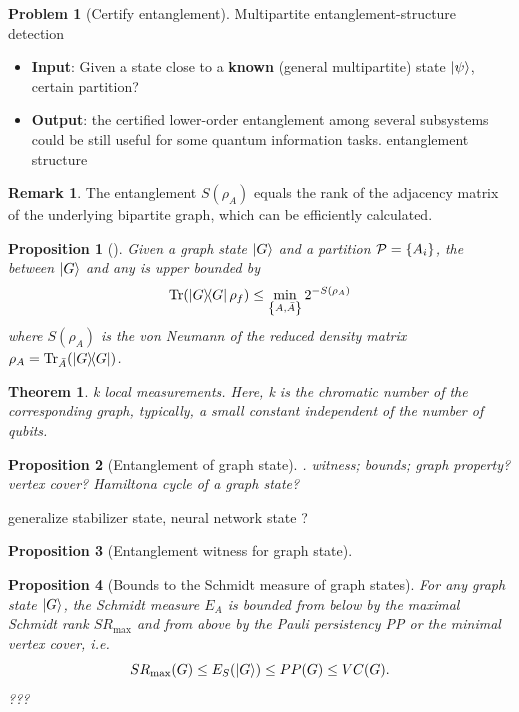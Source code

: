 \documentclass[
10pt,
aps,
pra,
linenumbers,
floatfix,
]{revtex4-2}
\theoremstyle{plain}
\newtheorem{theorem}{Theorem}
\newtheorem{proposition}{Proposition}
\theoremstyle{definition}
\newtheorem{remark}{Remark}
\newtheorem{problem}{Problem}
\newcommand{\dm}{\rho}
\begin{document}
\begin{problem}[Certify entanglement]
	Multipartite entanglement-structure detection
	\begin{itemize}
		\item \textbf{Input}: Given a state close to a \textbf{known} (general multipartite) state $\ket{\psi}$,
		certain partition?
		\item \textbf{Output}: the certified lower-order entanglement among several subsystems could be still useful for some quantum information tasks.
		entanglement structure
	\end{itemize}
\end{problem}
\begin{remark}
	The entanglement  $S( \dm_A )$ equals the rank of the adjacency matrix of the underlying bipartite graph, which can be efficiently calculated.
\end{remark}
\begin{proposition}[\cite{zhouDetectingMultipartiteEntanglement2019}]
	Given a graph state $\ket{G}$ and a partition $\mathcal{P}=\qty{A_i}$, the  between $\ket{G}$ and any  is upper bounded by
	\begin{equation}
		\Tr(\op{G} \dm_f) \le \min_{\qty{A,\bar{A}}} 2^{-S(\dm_A)}
	\end{equation}
	where $S(\dm_A)$ is the von Neumann  of the reduced density matrix $\dm_A=\Tr_{\bar{A}}(\op{G})$.
\end{proposition}
\begin{theorem}
	k local measurements. Here, k is the chromatic number of the corresponding graph, typically, a small constant independent of the number of qubits.
\end{theorem}
\begin{proposition}[Entanglement of graph state]
	\cite{heinEntanglementGraphStates2006}.
	witness; bounds; graph property? vertex cover?
	Hamiltona cycle of a graph state? 
\end{proposition}
generalize \cite{zhangEfficientEntanglementGeneration2021}
stabilizer state, neural network state \cite{gaoEfficientRepresentationQuantum2017}?
\begin{proposition}[Entanglement witness for graph state]
\end{proposition}
\begin{proposition}[Bounds to the Schmidt measure of graph states]
	For any graph state $\ket{G}$, the Schmidt measure $E_A$ is bounded from below by the maximal Schmidt rank $SR_{\max}$ and from above by the Pauli persistency PP or the minimal vertex cover, i.e.
	\begin{equation}
		SR_{\max} (G) \le E_S(\ket{G}) \le PP(G) \le VC(G).
	\end{equation}
	???
\end{proposition}
\end{document}
